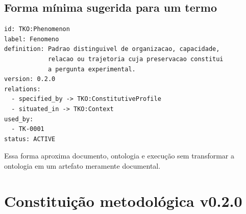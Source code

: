 \documentclass[11pt,a4paper]{article}
\begin{document}
\subsection{Forma mínima sugerida para um termo}

\begin{lstlisting}
id: TKO:Phenomenon
label: Fenomeno
definition: Padrao distinguivel de organizacao, capacidade,
            relacao ou trajetoria cuja preservacao constitui
            a pergunta experimental.
version: 0.2.0
relations:
  - specified_by -> TKO:ConstitutiveProfile
  - situated_in -> TKO:Context
used_by:
  - TK-0001
status: ACTIVE
\end{lstlisting}

Essa forma aproxima documento, ontologia e execução sem transformar a ontologia em
um artefato meramente documental.

\section{Constituição metodológica v0.2.0}
\end{document}
